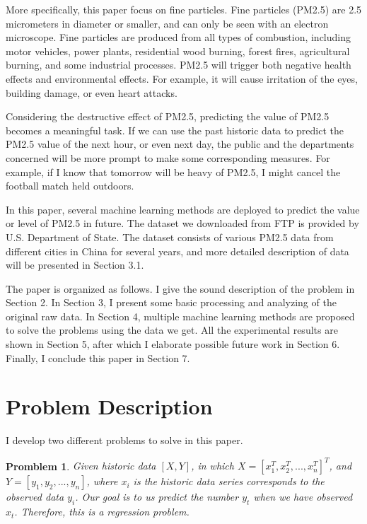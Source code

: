 \documentclass{sig-alternate}
\begin{document}
More specifically, this paper focus on fine particles. Fine particles (PM2.5) are 2.5 micrometers in diameter or smaller, and can only be seen with an electron microscope. Fine particles are produced from all types of combustion, including motor vehicles, power plants, residential wood burning, forest fires, agricultural burning, and some industrial processes. PM2.5 will trigger both negative health effects and environmental effects. For example, it will cause irritation of the eyes, building damage, or even heart attacks.

Considering the destructive effect of PM2.5, predicting the value of PM2.5 becomes a meaningful task. If we can use the past historic data to predict the PM2.5 value of the next hour, or even next day, the public and the departments concerned will be more prompt to make some corresponding measures. For example, if I know that tomorrow will be heavy of PM2.5, I might cancel the football match held outdoors.

In this paper, several machine learning methods are deployed to predict the value or level of PM2.5 in future. The dataset we downloaded from FTP is provided by U.S. Department of State\cite{data}. The dataset consists of various PM2.5 data from different cities in China for several years, and more detailed description of data will be presented in Section 3.1.

The paper is organized as follows. I give the sound description of the problem in Section 2. In Section 3, I present some basic processing and analyzing of the original raw data. In Section 4, multiple machine learning methods are proposed to solve the problems using the data we get. All the experimental results are shown in Section 5, after which I elaborate possible future work in Section 6. Finally, I conclude this paper in Section 7.



\section{Problem Description}
I develop two different problems to solve in this paper.
\newtheorem{theorem}{Promblem}
\begin{theorem}
Given historic data $[X,Y]$, in which $X=[x_{1}^{T},x_{2}^{T},...,x_{n}^{T}]^{T}$, and $Y=[y_1, y_2, ..., y_n]$, where $x_i$ is the historic data series corresponds to the observed data $y_i$. Our goal is to us predict the number $y_t$ when we have observed $x_t$. Therefore, this is a regression problem.
\end{theorem}
\end{document}
